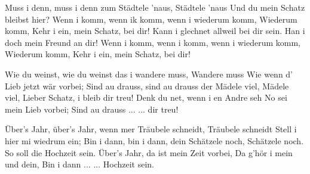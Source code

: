 \footnotemark [
ititle={Muss i denn}]


\beginverse
Muss i denn, muss i denn zum Städtele 'naus, Städtele 'naus
Und du mein Schatz bleibst hier?
Wenn i komm, wenn ik komm, wenn i wiederum komm,
Wiederum komm,
Kehr i ein, mein Schatz, bei dir!
Kann i glechnet allweil bei dir sein.
Han i doch mein Freund an dir!
Wenn i komm, wenn i komm, wenn i wiederum komm,
Wiederum komm,
Kehr i ein, mein Schatz, bei dir!
\endverse

\beginverse
Wie du weinst, wie du weinst das i wandere muss, 
Wandere muss
Wie wenn d' Lieb jetzt wär vorbei;
Sind au drauss, sind au drauss der Mädele viel, Mädele viel,
Lieber Schatz, i bleib dir treu!
Denk du net, wenn i en Andre seh
No sei mein Lieb vorbei;
Sind au drauss ... ... dir treu!
\endverse

\beginverse
Über's Jahr, über's Jahr, wenn mer Träubele schneidt, 
Träubele schneidt
Stell i hier mi wiedrum ein;
Bin i dann, bin i dann, dein Schätzele noch, Schätzele noch.
So soll die Hochzeit sein.
Über's Jahr, da ist mein Zeit vorbei,
Da g'hör i mein und dein,
Bin i dann ... ... Hochzeit sein.
\endverse
\endsong